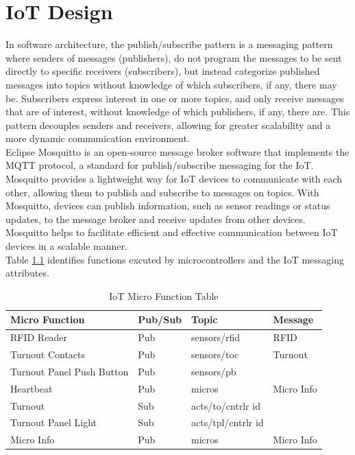 \chapter{IoT Design}

In software architecture, the publish/subscribe pattern is a messaging pattern where senders of messages (publishers), do not program the messages to be sent directly to specific receivers (subscribers), but instead categorize published messages into topics without knowledge of which subscribers, if any, there may be. Subscribers express interest in one or more topics, and only receive messages that are of interest, without knowledge of which publishers, if any, there are. This pattern decouples senders and receivers, allowing for greater scalability and a more dynamic communication environment.\vspace{5mm} \\
Eclipse Mosquitto is an open-source message broker software that implements the \ac{MQTT} protocol, a standard for publish/subscribe messaging for the \ac{IoT}. Mosquitto provides a lightweight way for IoT devices to communicate with each other, allowing them to publish and subscribe to messages on topics. With Mosquitto, devices can publish information, such as sensor readings or status updates, to the message broker and receive updates from other devices. Mosquitto helps to facilitate efficient and effective communication between \ac{IoT} devices in a scalable manner.\vspace{5mm} \\
Table \ref{iot-table} identifies functions excuted by microcontrollers and the \ac{IoT} messaging attributes.\vspace{5mm} \\

\begin{table}[!ht]
    \begin{center}
    \begin{tabular}{|l|l|l|l|}
    \hline
        \textbf{Micro Function} & \textbf{Pub/Sub} & \textbf{Topic} & \textbf{Message} \\ \hline
        RFID Reader & Pub & sensors/rfid & RFID \\ \hline
        Turnout Contacts & Pub & sensors/toc & Turnout\\ \hline
        Turnout Panel Push Button & Pub & sensors/pb & \\ \hline
        Heartbeat & Pub & micros & Micro Info\\ \hline
        Turnout & Sub & acts/to/cntrlr id &  \\ \hline
        Turnout Panel Light & Sub & acts/tpl/cntrlr id &\\ \hline
        Micro Info & Pub & micros & Micro Info\\ \hline
    \end{tabular}
    \caption{\label{iot-table}IoT Micro Function Table}
    \end{center}
\end{table}

